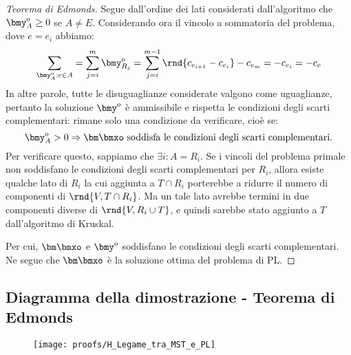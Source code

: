 \documentclass[\main/main.tex]{subfiles}
\begin{document}
\begin{proof}[Teorema di Edmonds]
  Segue dall'ordine dei lati considerati dall'algoritmo che \(\bmy^o_A \geq 0\) se \(A\neq E\). Considerando ora il vincolo a sommatoria del problema, dove \(e=e_i\) abbiamo:
  \[
    \sum_{\bmy^o_A: e \in A} = \sum_{j=i}^m \bmy^o_{R_j} = \sum_{j=i}^{m-1}\rnd{c_{e_{i+1}}-c_{e_i}} - c_{e_m} = -c_{e_i} = -c_e
  \]
  In altre parole, tutte le disuguaglianze considerate valgono come uguaglianze, pertanto la soluzione \(\bmy^o\) è ammissibile e rispetta le condizioni degli scarti complementari: rimane solo una condizione da verificare, cioè se:
  \[
    \bmy^o_A > 0 \Rightarrow \bm\bmxo \text{ soddisfa le condizioni degli scarti complementari.}
  \]
  Per verificare questo, sappiamo che \(\exists i: A = R_i\). Se i vincoli del problema primale non soddisfano le condizioni degli scarti complementari per \(R_i\), allora esiste qualche lato di \(R_i\) la cui aggiunta a \(T\cap R_i\) porterebbe a ridurre il numero di componenti di \(\rnd{V, T \cap R_i}\). Ma un tale lato avrebbe termini in due componenti diverse di \(\rnd{V, R_i \cup T}\), e quindi sarebbe stato aggiunto a \(T\) dall'algoritmo di Kruskal.

  Per cui, \(\bm\bmxo\) e \(\bmy^o\) soddisfano le condizioni degli scarti complementari. Ne segue che \(\bm\bmxo\) è la soluzione ottima del problema di PL.
\end{proof}
\clearpage
\subsection{Diagramma della dimostrazione - Teorema di Edmonds}
\begin{figure}
  \texttt{[image: proofs/H\_Legame\_tra\_MST\_e\_PL]}
\end{figure}
\end{document}
